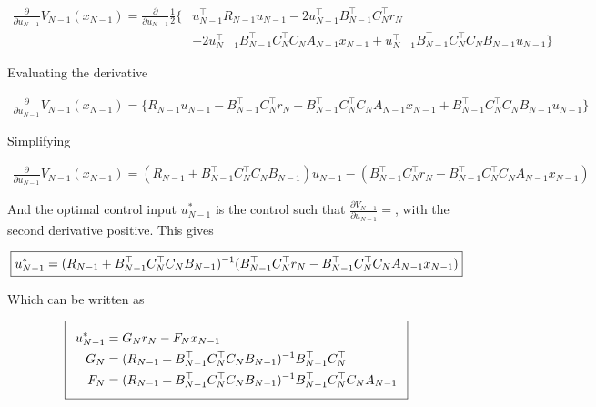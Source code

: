 \documentclass[11pt,letterpaper,onecolumn,notitlepage]{article}
\begin{document}
  \begin{equation*}
    \begin{split}
      \frac{\partial}{\partial u_{N-1}}V_{N-1}(x_{N-1})=\frac{\partial}{\partial u_{N-1}}\frac{1}{2}\biggr\{&u_{N-1}^{\top}R_{N-1}u_{N-1}-2u_{N-1}^{\top}B_{N-1}^{\top}C_{N}^{\top}r_{N} \\
      &+2u_{N-1}^{\top}B_{N-1}^{\top}C_{N}^{\top}C_{N}A_{N-1}x_{N-1}+
      u_{N-1}^{\top}B_{N-1}^{\top}C_{N}^{\top}C_{N}B_{N-1}u_{N-1}\biggr\}
    \end{split}
  \end{equation*}

  Evaluating the derivative

  \begin{equation*}
    \begin{split}
      \frac{\partial}{\partial u_{N-1}}V_{N-1}(x_{N-1})=\biggr\{R_{N-1}u_{N-1}-B_{N-1}^{\top}C_{N}^{\top}r_{N}+B_{N-1}^{\top}C_{N}^{\top}C_{N}A_{N-1}x_{N-1}+B_{N-1}^{\top}C_{N}^{\top}C_{N}B_{N-1}u_{N-1}\biggr\}
    \end{split}
  \end{equation*}

  Simplifying

  \begin{equation*}
    \begin{split}
      \frac{\partial}{\partial u_{N-1}}V_{N-1}(x_{N-1})=(R_{N-1}+B_{N-1}^{\top}C_{N}^{\top}C_{N}B_{N-1})u_{N-1}-(B_{N-1}^{\top}C_{N}^{\top}r_{N}-B_{N-1}^{\top}C_{N}^{\top}C_{N}A_{N-1}x_{N-1})
    \end{split}
  \end{equation*}

  And the optimal control input $u_{N-1}^{*}$ is the control such that $\frac{\partial V_{N-1}}{\partial u_{N-1}}=$, with the second derivative positive.
  This gives

  \begin{equation*}
    \boxed{%
      u_{N-1}^{*}=(R_{N-1}+B_{N-1}^{\top}C_{N}^{\top}C_{N}B_{N-1})^{-1}(B_{N-1}^{\top}C_{N}^{\top}r_{N}-B_{N-1}^{\top}C_{N}^{\top}C_{N}A_{N-1}x_{N-1})
    }
  \end{equation*}

  Which can be written as

  \begin{equation*}
    \addtolength{\fboxsep}{5pt}
    \boxed{%
      \begin{split}
        u_{N-1}^{*}&=G_{N}r_{N}-F_{N}x_{N-1} \\
        G_{N}&=(R_{N-1}+B_{N-1}^{\top}C_{N}^{\top}C_{N}B_{N-1})^{-1}B_{N-1}^{\top}C_{N}^{\top} \\
        F_{N}&=(R_{N-1}+B_{N-1}^{\top}C_{N}^{\top}C_{N}B_{N-1})^{-1}B_{N-1}^{\top}C_{N}^{\top}C_{N}A_{N-1}
      \end{split}
    }
  \end{equation*}
\end{document}
